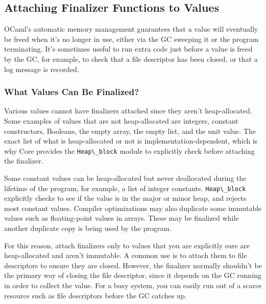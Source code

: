 \hypertarget{attaching-finalizer-functions-to-values}{%
\subsection{Attaching Finalizer Functions to
Values}\label{attaching-finalizer-functions-to-values}}

OCaml's automatic memory management guarantees that a value will
eventually be freed when it's no longer in use, either via the GC
sweeping it or the program terminating. It's sometimes useful to run
extra code just before a value is freed by the GC, for example, to check
that a file descriptor has been closed, or that a log message is
recorded. 

\hypertarget{what-values-can-be-finalized}{%
\subsubsection{What Values Can Be
Finalized?}\label{what-values-can-be-finalized}}

Various values cannot have finalizers attached since they aren't
heap-allocated. Some examples of values that are not heap-allocated are
integers, constant constructors, Booleans, the empty array, the empty
list, and the unit value. The exact list of what is heap-allocated or
not is implementation-dependent, which is why Core provides the
\passthrough{\lstinline!Heap\_block!} module to explicitly check before
attaching the finalizer.

Some constant values can be heap-allocated but never deallocated during
the lifetime of the program, for example, a list of integer constants.
\passthrough{\lstinline!Heap\_block!} explicitly checks to see if the
value is in the major or minor heap, and rejects most constant values.
Compiler optimizations may also duplicate some immutable values such as
floating-point values in arrays. These may be finalized while another
{duplicate} copy is being used by the program.

For this reason, attach finalizers only to values that you are
explicitly sure are heap-allocated and aren't immutable. A common use is
to attach them to file descriptors to ensure they are closed. However,
the finalizer normally shouldn't be the primary way of closing the file
descriptor, since it depends on the GC running in order to collect the
value. For a busy system, you can easily run out of a scarce resource
such as file descriptors before the GC catches up.

